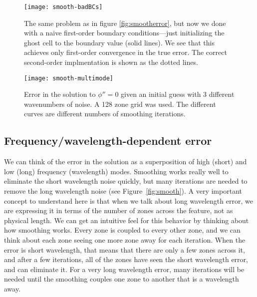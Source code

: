 \begin{figure}
\centering
\texttt{[image: smooth-badBCs]}
\caption[Convergence of smoothing in first-order BCs]{\label{fig:smooth-badbcs} 
  The same problem as in figure \ref{fig:smootherror}, but
  now we done with a naive first-order boundary conditions---just initializing
  the ghost cell to the boundary value (solid lines).  We see that this 
  achieves only first-order convergence in the true error.  The correct
  second-order implmentation is shown as the dotted lines.
  \\ }
\end{figure}


\begin{figure}[t]
\centering
\texttt{[image: smooth-multimode]}
\caption[Smoothing of different wavenumbers]{\label{fig:mg:smooth}
  Error in the solution to $\phi'' = 0$ given an initial guess with 3
  different wavenumbers of noise.  A 128 zone grid was used.  The
  different curves are different numbers of smoothing
  iterations. \\ }
\end{figure}

\subsection{Frequency/wavelength-dependent error}

We can think of the error in the solution as a superposition of high
(short) and low (long) frequency (wavelength) modes.  Smoothing works
really well to eliminate the short wavelength noise quickly, but many
iterations are needed to remove the long wavelength noise (see
Figure~\ref{fig:smooth}).  A very important concept to understand here
is that when we talk about long wavelength error, we are expressing it
in terms of the number of zones across the feature, not as physical
length.  We can get an intuitive feel for this behavior by thinking
about how smoothing works.  Every zone is coupled to every other zone,
and we can think about each zone seeing one more zone away for each
iteration.  When the error is short wavelength, that means that there
are only a few zones across it, and after a few iterations, all of the
zones have seen the short wavelength error, and can eliminate it.  For
a very long wavelength error, many iterations will be needed until the
smoothing couples one zone to another that is a wavelength away.

